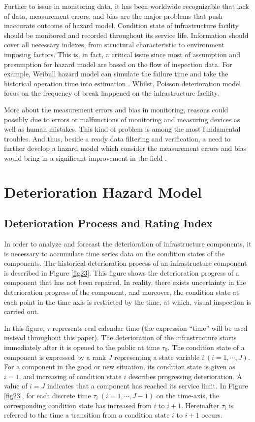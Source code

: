 Further to issue in monitoring data, it has been worldwide recognizable that lack of data,  measurement errors, and bias are the major problems that push inaccurate outcome of hazard model. Condition state of infrastructure facility should be monitored and recorded throughout its service life. Information should cover all necessary indexes, from structural characteristic to environment imposing factors. This is, in fact, a critical issue since most of assumption and presumption for hazard model are based on the flow of inspection data. For example, Weibull hazard model can simulate the failure time and take the historical operation time into estimation \cite{aokia}. Whilst, Poisson deterioration model focus on the frequency of break happened on the infrastructure facility. 

More about the measurement errors and bias in monitoring, reasons could possibly due to errors or malfunctions of monitoring and measuring devices as well as human mistakes. This kind of problem is among the most fundamental troubles. And thus, beside a ready data filtering and verification, a need to further develop a hazard model which consider the measurement errors and bias would bring in a significant improvement in the field \cite{18}.
\section{Deterioration Hazard Model}
\label{23}
\subsection{Deterioration Process and Rating Index}
\label{231}
In order to analyze and forecast the deterioration of infrastructure components, it is necessary to accumulate time series data on the condition states of the components. The historical deterioration process of an infrastructure component is described in Figure \ref{fig23}. This figure shows the deterioration progress of a component that has not been repaired. In reality, there exists uncertainty in the deterioration progress of the component, and moreover, the condition state at each point in the time axis is restricted by the time, at which, visual inspection is carried out. 

In this figure, $\tau$ represents real calendar time (the expression ``time'' will be used instead throughout this paper). The deterioration of the infrastructure starts immediately after it is opened to the public at time $\tau_0$. The condition state of a component is expressed by a rank $J$ representing a state variable $i~(i=1,\cdots,J)$. For a component in the good or new situation, its condition state is given as $i=1$, and increasing of condition state $i$ describes progressing deterioration. A value of $i=J$ indicates that a component has reached its service limit. In Figure \ref{fig23}, for each discrete time $\tau_i~(i=1,\cdots,J-1)$ on the time-axis, the corresponding condition state has increased from $i$ to $i+1$. Hereinafter $\tau_i$ is referred to the time a transition from a condition state $i$ to $i+1$ occurs.

